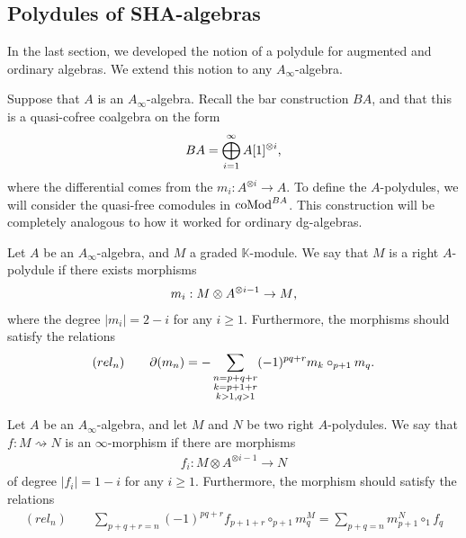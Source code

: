 \documentclass[../thesis.tex]{subfiles}
\begin{document}

        \subsection{Polydules of SHA-algebras}
            In the last section, we developed the notion of a polydule for augmented and ordinary algebras. We extend this notion to any $A_\infty$-algebra.

            Suppose that $A$ is an $A_\infty$-algebra. Recall the bar construction $BA$, and that this is a quasi-cofree coalgebra on the form
            \begin{align*}
                BA = \bigoplus_{i=1}^\infty A[1]^{\otimes i}\tt{,}
            \end{align*}
            where the differential comes from the $m_i : A^{\otimes i} \rightarrow A$. To define the $A$-polydules, we will consider the quasi-free comodules in $\tt{coMod}^{BA}$. This construction will be completely analogous to how it worked for ordinary dg-algebras.
            
            \begin{definition}[$A$-polydule]
                Let $A$ be an $A_\infty$-algebra, and $M$ a graded $\mathbb{K}$-module. We say that $M$ is a right $A$-polydule if there exists morphisms
                \begin{align*}
                    m_i : M \otimes A^{\otimes i - 1} \rightarrow M\tt{,}
                \end{align*}
                where the degree $|m_i| = 2 - i$ for any $i \geq 1$. Furthermore, the morphisms should satisfy the relations
                \begin{align*}
                    (rel_n) \qquad \partial(m_n) = - \sum_{\substack{n = p + q + r \\ k = p + 1 + r \\ k > 1, q > 1}}(-1)^{pq+r}m_k\circ_{p+1}m_q\tt{.}
                \end{align*}
            \end{definition}

            \begin{definition}
                Let $A$ be an $A_\infty$-algebra, and let $M$ and $N$ be two right $A$-polydules. We say that $f : M \rightsquigarrow N$ is an $\infty$-morphism if there are morphisms
                \begin{align*}
                    f_i : M \otimes A^{\otimes i - 1} \rightarrow N
                \end{align*}
                of degree $|f_i| = 1 - i$ for any $i \geq 1$. Furthermore, the morphism should satisfy the relations
                \begin{align*}
                    (rel_n)\qquad \sum_{p+q+r = n} (-1)^{pq+r}f_{p+1+r} \circ_{p+1} m^M_{q} = \sum_{p+q = n} m^N_{p+1} \circ_1 f_q
                \end{align*}
            \end{definition}
\end{document}
